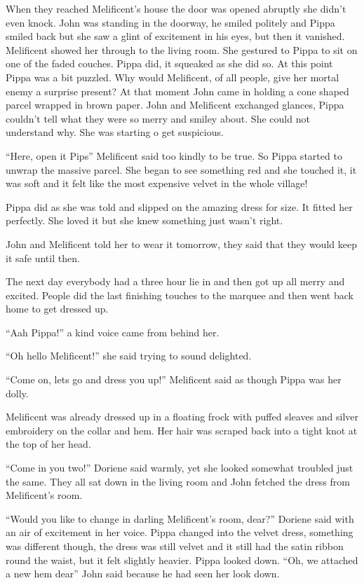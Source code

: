 When they reached Melificent's house the door was opened abruptly she
didn't even knock. John was standing in the doorway, he smiled politely
and Pippa smiled back but she saw a glint of excitement in his eyes, but
then it vanished. Melificent showed her through to the living room. She
gestured to Pippa to sit on one of the faded couches. Pippa did, it
squeaked as she did so. At this point Pippa was a bit puzzled. Why would
Melificent, of all people, give her mortal enemy a surprise present? At
that moment John came in holding a cone shaped parcel wrapped in brown
paper. John and Melificent exchanged glances, Pippa couldn't tell what
they were so merry and smiley about. She could not understand why. She
was starting o get suspicious.

``Here, open it Pips'' Melificent said too kindly to be true. So Pippa
started to unwrap the massive parcel. She began to see something red and
she touched it, it was soft and it felt like the most expensive velvet
in the whole village!

Pippa did as she was told and slipped on the amazing dress for size. It
fitted her perfectly. She loved it but she knew something just wasn't
right.

John and Melificent told her to wear it tomorrow, they said that they
would keep it safe until then.

The next day everybody had a three hour lie in and then got up all merry
and excited. People did the last finishing touches to the marquee and
then went back home to get dressed up.

``Aah Pippa!'' a kind voice came from behind her.

``Oh hello Melificent!'' she said trying to sound delighted.

``Come on, lets go and dress you up!'' Melificent said as though Pippa
was her dolly.

Melificent was already dressed up in a floating frock with puffed
sleaves and silver embroidery on the collar and hem. Her hair was
scraped back into a tight knot at the top of her head.

``Come in you two!'' Doriene said warmly, yet she looked somewhat
troubled just the same. They all sat down in the living room and John
fetched the dress from Melificent's room.

``Would you like to change in darling Melificent's room, dear?'' Doriene
said with an air of excitement in her voice. Pippa changed into the
velvet dress, something was different though, the dress was still velvet
and it still had the satin ribbon round the waist, but it felt slightly
heavier. Pippa looked down. ``Oh, we attached a new hem dear'' John said
because he had seen her look down.

